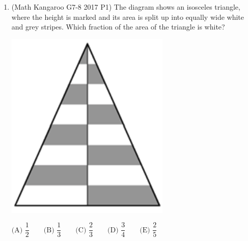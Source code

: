 \documentclass[11pt, oneside]{article}   	%
\begin{document}
\begin{enumerate}
\item (Math Kangaroo G7-8 2017 P1)  The diagram shows an isosceles triangle, where the height is marked and its area is split up into equally wide white and grey stripes. Which fraction of the area of the triangle is white?
\begin{center}
\includegraphics[scale=0.75]{imgs/2017-g7-8-p1-1.png}
\end{center}
$\text{(A) } \dfrac{1}{2} \qquad $$\text{(B) } \dfrac{1}{3} \qquad $$\text{(C) } \dfrac{2}{3}  \qquad $$\text{(D) } \dfrac{3}{4} \qquad $$\text{(E) } \dfrac{2}{5}$

\end{enumerate}
\end{document}
